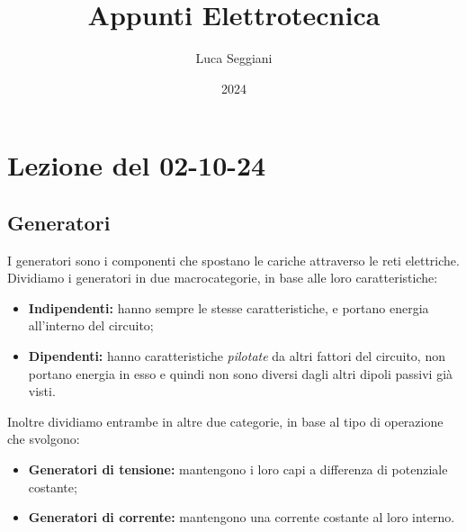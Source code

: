 \documentclass[a4paper,11pt]{article}
\title{Appunti Elettrotecnica}
\author{Luca Seggiani}
\date{2024}
\begin{document}
\section{Lezione del 02-10-24}

\thispagestyle{empty}
\pagestyle{fancy}

\subsection{Generatori}
I generatori sono i componenti che spostano le cariche attraverso le reti elettriche.
Dividiamo i generatori in due macrocategorie, in base alle loro caratteristiche:
\begin{itemize}
	\item \textbf{Indipendenti:} hanno sempre le stesse caratteristiche, e portano energia all'interno del circuito;
	\item \textbf{Dipendenti:} hanno caratteristiche \textit{pilotate} da altri fattori del circuito, non portano energia in esso e quindi non sono diversi dagli altri dipoli passivi già visti.
\end{itemize}

Inoltre dividiamo entrambe in altre due categorie, in base al tipo di operazione che svolgono:
\begin{itemize}
	\item \textbf{Generatori di tensione:} mantengono i loro capi a differenza di potenziale costante;
	\item \textbf{Generatori di corrente:} mantengono una corrente costante al loro interno.
\end{itemize}
\end{document}
